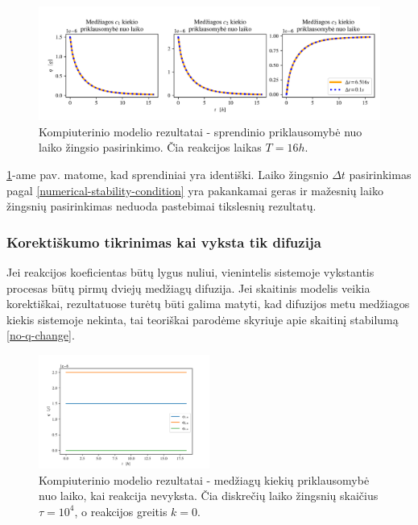 \begin{figure}[h!]

\centering

\includegraphics[width=\textwidth]{../assets/time-error-1.png}

\caption{Kompiuterinio modelio rezultatai - sprendinio priklausomybė nuo laiko žingsio pasirinkimo. Čia reakcijos laikas $T=16h$.}

\label{time-error}

\end{figure}

\ref{time-error}-ame pav. matome, kad sprendiniai yra identiški. Laiko žingsnio  $\Delta t$ pasirinkimas pagal \eqref{numerical-stability-condition} yra pakankamai geras ir mažesnių laiko žingsnių pasirinkimas neduoda pastebimai tikslesnių rezultatų.

\newpage
\subsubsection*{Korektiškumo tikrinimas kai vyksta tik difuzija}

Jei reakcijos koeficientas būtų lygus nuliui, vienintelis sistemoje vykstantis procesas būtų pirmų dviejų medžiagų difuzija. Jei skaitinis modelis veikia korektiškai, rezultatuose turėtų būti galima matyti, kad difuzijos metu medžiagos kiekis sistemoje nekinta, tai teoriškai parodėme skyriuje apie skaitinį stabilumą \eqref{no-q-change}.

\begin{figure}[h!]
    \centering
    \includegraphics[width=0.5\textwidth]{../assets/only-diff-1.png}
    \caption{Kompiuterinio modelio rezultatai - medžiagų kiekių priklausomybė nuo laiko, kai reakcija nevyksta. Čia diskrečių laiko žingsnių skaičius $\tau=10^4$, o reakcijos greitis $k = 0$. }
    \label{no-reaction}
\end{figure}

